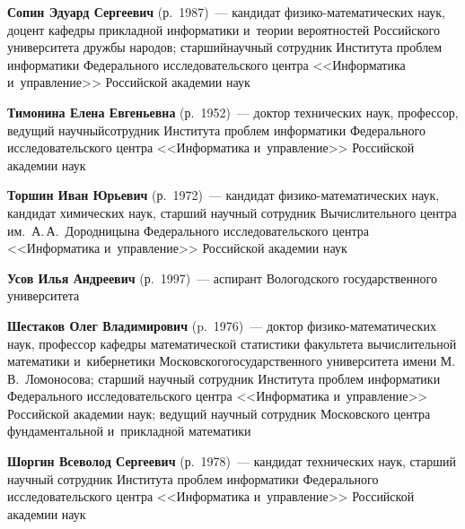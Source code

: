 \begin{multicols}{2}
\noindent
\textbf{Сопин Эдуард Сергеевич} (р.\ 1987)~--- кандидат фи\-зи\-ко-ма\-те\-ма\-ти\-че\-ских наук, 
доцент ка\-фед\-ры при\-клад\-ной информатики и~тео\-рии вероятностей Российского университета друж\-бы народов; 
старший\linebreak научный сотрудник Института проб\-лем информатики Федерального исследовательского цент\-ра 
<<Информатика и~управ\-ле\-ние>> Российской академии наук

\noindent
\textbf{Тимонина Елена Евгеньевна} (р.\ 1952)~--- 
доктор технических наук, профессор, ведущий научный\linebreak сотрудник Института проб\-лем {информатики} Федерального исследовательского цент\-ра 
<<Информатика и~управ\-ле\-ние>> Российской академии наук

\noindent
\textbf{Торшин Иван Юрьевич} (р.\ 1972)~--- кандидат фи\-зи\-ко-ма\-те\-ма\-ти\-че\-ских наук, 
кандидат химических наук, старший научный сотрудник Вы\-чис\-ли\-тель\-но\-го цент\-ра им.\ А.\,А.~Дородницына 
Федерального исследовательского цент\-ра <<Информатика и~управ\-ле\-ние>> Российской академии наук


\noindent
\textbf{Усов Илья Андреевич} (р.\ 1997)~--- аспирант Вологодского государственного университета

\noindent
\textbf{Шестаков Олег Владимирович} (p.\ 1976)~--- 
доктор фи\-зи\-ко-ма\-те\-ма\-ти\-че\-ских наук, профессор ка\-фед\-ры математической ста\-ти\-сти\-ки 
факультета вы\-чис\-ли\-тель\-ной математики и~кибернетики Московского\linebreak государственного университета имени М.\,В.~Ломоносова; 
старший научный со\-труд\-ник Института проб\-лем информатики Федерального исследовательского цент\-ра <<Информатика и~\mbox{управ\-ле\-ние}>>
 Российской академии наук; ведущий научный со\-труд\-ник Московского цент\-ра фундаментальной и~при\-клад\-ной математики
 

\noindent
\textbf{Шоргин Всеволод Сергеевич} (р.\ 1978)~--- кандидат технических наук, старший научный сотрудник Института проб\-лем 
информатики Федерального исследовательского цент\-ра <<Информатика и~управ\-ле\-ние>> Российской академии наук





\def\leftkol{ОБ АВТОРАХ}

\def\rightkol{ОБ АВТОРАХ}


 \label{end\stat}



\end{multicols}

\def\leftkol{ОБ АВТОРАХ}
\def\rightkol{ОБ АВТОРАХ}

\newpage